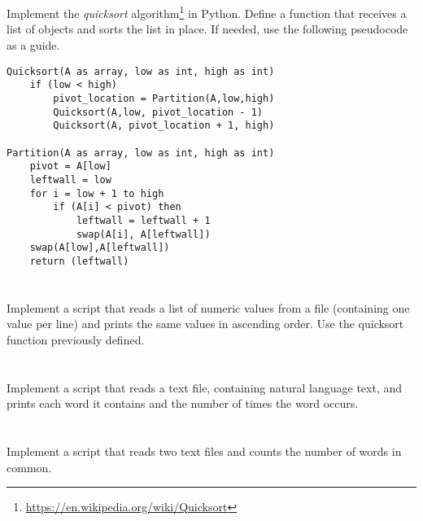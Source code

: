 \documentclass[12pt]{article}
\begin{document}

\section{}

Implement the \emph{quicksort} algorithm\footnote{\url{https://en.wikipedia.org/wiki/Quicksort}} in Python. Define a function that receives a list of objects and sorts the list in place. If needed, use the following pseudocode as a guide.
\footnotesize
\begin{verbatim}
Quicksort(A as array, low as int, high as int)
    if (low < high)
        pivot_location = Partition(A,low,high)
        Quicksort(A,low, pivot_location - 1)
        Quicksort(A, pivot_location + 1, high)

Partition(A as array, low as int, high as int)
    pivot = A[low]
    leftwall = low
    for i = low + 1 to high
        if (A[i] < pivot) then
            leftwall = leftwall + 1
            swap(A[i], A[leftwall])
    swap(A[low],A[leftwall])
    return (leftwall)
\end{verbatim}
\normalsize

\section{}

Implement a script that reads a list of numeric values from a file (containing one value per line) and prints the same values in ascending order. Use the quicksort function previously defined.

\section{}

Implement a script that reads a text file, containing natural language text, and prints each word it contains and the number of times the word occurs.

\section{}

Implement a script that reads two text files and counts the number of words in common.
\end{document}
